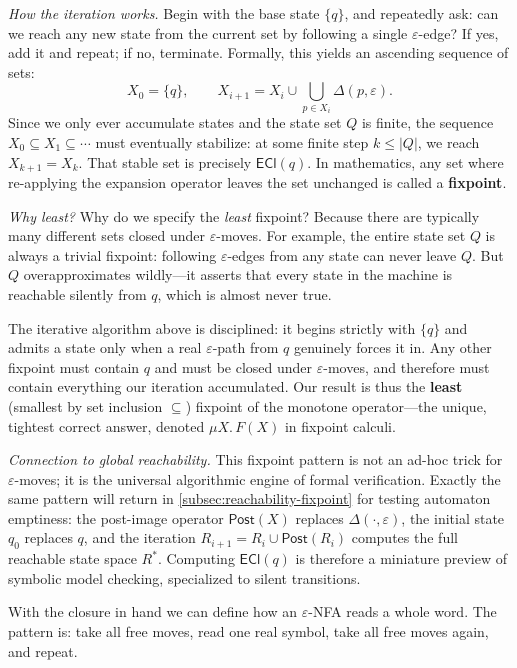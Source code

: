 \medskip\noindent
\textit{How the iteration works.}
Begin with the base state $\{q\}$, and repeatedly ask: can we reach any new state from the current set by following a single $\varepsilon$-edge? If yes, add it and repeat; if no, terminate. Formally, this yields an ascending sequence of sets:
\[
  X_0 = \{q\},\qquad
  X_{i+1} = X_i\cup\bigcup_{p\in X_i}\Delta(p,\varepsilon).
\]
Since we only ever accumulate states and the state set $Q$ is finite, the sequence $X_0\subseteq X_1\subseteq\cdots$ must eventually stabilize: at some finite step $k\le|Q|$, we reach $X_{k+1}=X_k$. That stable set is precisely $\mathsf{ECl}(q)$. In mathematics, any set where re-applying the expansion operator leaves the set unchanged is called a \textbf{fixpoint}.

\medskip\noindent
\textit{Why \emph{least}?}
Why do we specify the \emph{least} fixpoint? Because there are typically many different sets closed under $\varepsilon$-moves. For example, the entire state set $Q$ is always a trivial fixpoint: following $\varepsilon$-edges from any state can never leave $Q$. But $Q$ overapproximates wildly---it asserts that every state in the machine is reachable silently from $q$, which is almost never true.

The iterative algorithm above is disciplined: it begins strictly with $\{q\}$ and admits a state only when a real $\varepsilon$-path from $q$ genuinely forces it in. Any other fixpoint must contain $q$ and must be closed under $\varepsilon$-moves, and therefore must contain everything our iteration accumulated. Our result is thus the \textbf{least} (smallest by set inclusion $\subseteq$) fixpoint of the monotone operator---the unique, tightest correct answer, denoted $\mu X.\,F(X)$ in fixpoint calculi.

\medskip\noindent
\textit{Connection to global reachability.}
This fixpoint pattern is not an ad-hoc trick for $\varepsilon$-moves; it is the universal algorithmic engine of formal verification. Exactly the same pattern will return in \cref{subsec:reachability-fixpoint} for testing automaton emptiness: the post-image operator $\mathsf{Post}(X)$ replaces $\Delta(\cdot,\varepsilon)$, the initial state $q_0$ replaces $q$, and the iteration $R_{i+1}=R_i\cup\mathsf{Post}(R_i)$ computes the full reachable state space $R^*$. Computing $\mathsf{ECl}(q)$ is therefore a miniature preview of symbolic model checking, specialized to silent transitions.

With the closure in hand we can define how an $\varepsilon$-NFA reads a
whole word.  The pattern is: take all free moves, read one real symbol,
take all free moves again, and repeat.

